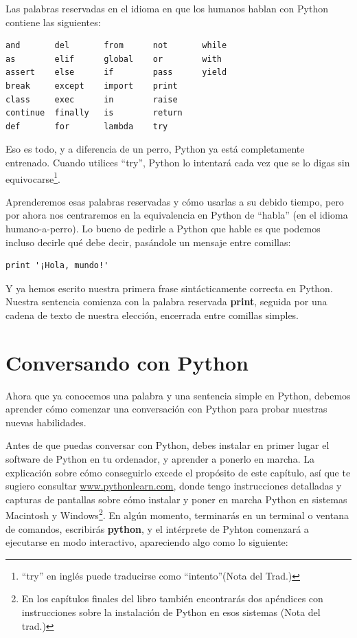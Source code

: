 Las palabras reservadas en el idioma en que los humanos hablan con
Python contiene las siguientes:

\beforeverb
\begin{verbatim}
and       del       from      not       while    
as        elif      global    or        with     
assert    else      if        pass      yield    
break     except    import    print              
class     exec      in        raise              
continue  finally   is        return             
def       for       lambda    try
\end{verbatim}
\afterverb
%
Eso es todo, y a diferencia de un perro, Python ya está completamente entrenado.
Cuando utilices ``try'', Python lo intentará cada vez que se lo digas sin
equivocarse\footnote{``try'' en inglés puede traducirse como ``intento''(Nota del Trad.)}.

Aprenderemos esas palabras reservadas y cómo usarlas a su debido tiempo,
pero por ahora nos centraremos en la equivalencia en Python de ``habla''
(en el idioma humano-a-perro). Lo bueno de pedirle a Python que hable
es que podemos incluso decirle qué debe decir, pasándole un mensaje entre comillas:

\beforeverb
\begin{verbatim}
print '¡Hola, mundo!'
\end{verbatim}
\afterverb

Y ya hemos escrito nuestra primera frase sintácticamente correcta en Python.
Nuestra sentencia comienza con la palabra reservada {\bf print}, seguida
por una cadena de texto de nuestra elección, encerrada entre comillas simples.

\section{Conversando con Python}

Ahora que ya conocemos una palabra y una sentencia simple en Python,
debemos aprender cómo comenzar una conversación con Python para probar
nuestras nuevas habilidades.

Antes de que puedas conversar con Python, debes instalar en primer lugar
el software de Python en tu ordenador, y aprender a ponerlo en marcha.
La explicación sobre cómo conseguirlo excede el propósito de este capítulo,
así que te sugiero consultar \url{www.pythonlearn.com}, donde tengo
instrucciones detalladas y capturas de pantallas sobre cómo instalar y poner en marcha
Python en sistemas Macintosh y Windows\footnote{En los capítulos finales del libro también
encontrarás dos apéndices con instrucciones sobre la instalación de Python en esos sistemas (Nota
del trad.)}. En algún momento, terminarás en un terminal
o ventana de comandos, escribirás {\bf python}, y el intérprete de Pyhton
comenzará a ejecutarse en modo interactivo, apareciendo algo como lo siguiente:

